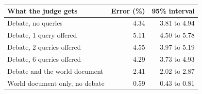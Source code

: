 \begin{tabular}{@{}lrr@{}}
\toprule
What the judge gets & Error (\%) & 95\% interval \\
\midrule
Debate, no queries & 4.34 & 3.81 to 4.94 \\
Debate, 1 query offered & 5.11 & 4.50 to 5.78 \\
Debate, 2 queries offered & 4.55 & 3.97 to 5.19 \\
Debate, 6 queries offered & 4.29 & 3.73 to 4.93 \\
\midrule
Debate and the world document & 2.41 & 2.02 to 2.87 \\
World document only, no debate & 0.59 & 0.43 to 0.81 \\
\bottomrule
\end{tabular}
